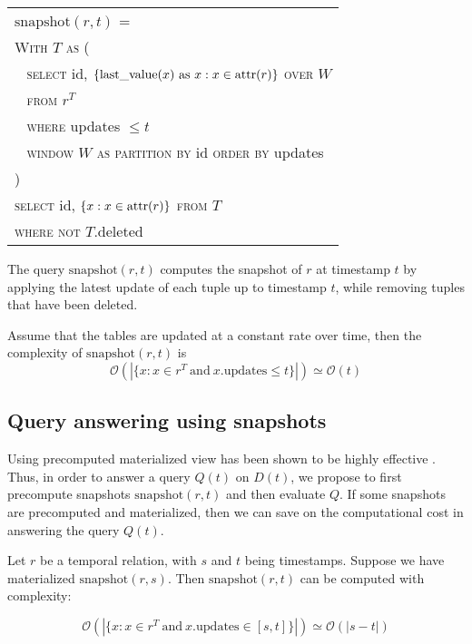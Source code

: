{\small
\begin{tabular}{|l|} \hline
    $\mathrm{snapshot}(r, t)$ = \\
    \verb|| \textsc{With} $T$ \textsc{as} ( \\
    \verb| | \textsc{select} id, $\{\mathrm{last\_value}(x) \mathrm{\ as\ } x:
    x\in\mathrm{attr}(r)\}$ \textsc{over} $W$ \\
    \verb| | \textsc{from} $r^T$ \\
    \verb| | \textsc{where} updates $\leq t$ \\
    \verb| | \textsc{window} $W$ \textsc{as} 
             \textsc{partition by} id \textsc{order by} updates\\
    \verb|| ) \\
    \verb|| \textsc{select} id, $\{x: x\in\mathrm{attr}(r)\}$ \textsc{from} $T$ \\
    \verb|| \textsc{where not} $T.$deleted \\ \hline
\end{tabular}
}

\vspace{1em}

The query $\mathrm{snapshot}(r, t)$ computes the snapshot of $r$ at timestamp
$t$ by applying the latest update of each tuple up to timestamp $t$, while
removing tuples that have been deleted.

\begin{prop}
    \label{prop:linear-time}
    Assume that the tables are updated at a constant rate over time,
    then the complexity of $\mathrm{snapshot}(r, t)$ is 
    $$\mathcal{O}(|\{x: x\in r^T\mathrm{\ and\ } x.\mathrm{updates} \leq t\}|)
    \simeq \mathcal{O}(t)$$
\end{prop}

\subsection{Query answering using snapshots}

Using precomputed materialized view has been shown to be highly effective \cite{sohrabi2016materialized,du2017deepsea}.
Thus, in order to answer a query $Q(t)$ on $D(t)$, we propose to first precompute
snapshots $\mathrm{snapshot}(r, t)$ and then evaluate $Q$.  If some snapshots
are precomputed and materialized, then we can save on the computational cost in
answering the query $Q(t)$.

\begin{prop}
    Let $r$ be a temporal relation, with $s$ and $t$ being timestamps.
    Suppose we have materialized $\mathrm{snapshot}(r, s)$.  Then
    $\mathrm{snapshot}(r, t)$ can be computed with complexity:

    $$\mathcal{O}(|\{x: x\in r^T\mathrm{\ and\ } x.\mathrm{updates} \in [s,
    t]\}|) \simeq \mathcal{O}(|s-t|)$$
\end{prop}

